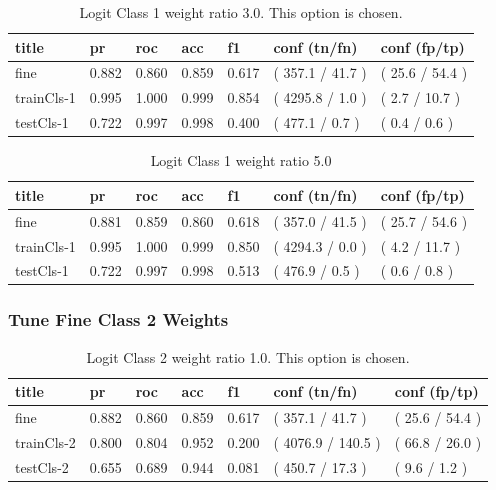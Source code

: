 \documentclass[ms]{nuthesis}
\begin{document}
\FloatBarrier
\begin{table}[H]
\centering
\caption{Logit Class 1 weight ratio 3.0. This option is chosen.}
\label{tab:LogRegCls1-Wt3}
\begin{tabular}{|l||l||l||l||l||l||l|}\toprule
title & pr & roc & acc & f1 & conf (tn/fn) & conf (fp/tp) \\ \midrule
fine & 0.882 & 0.860 & 0.859 & 0.617 & ( 357.1 / 41.7 ) & ( 25.6 / 54.4 ) \\
trainCls-1 & 0.995 & 1.000 & 0.999 & 0.854 & ( 4295.8 / 1.0 ) & ( 2.7 / 10.7 ) \\
testCls-1 & 0.722 & 0.997 & 0.998 & 0.400 & ( 477.1 / 0.7 ) & ( 0.4 / 0.6 ) \\ \bottomrule
\end{tabular}
\end{table}
\FloatBarrier

\FloatBarrier
\begin{table}[H]
\centering
\caption{Logit Class 1 weight ratio 5.0}
\label{tab:LogRegCls1-Wt5}
\begin{tabular}{|l||l||l||l||l||l||l|}\toprule
title & pr & roc & acc & f1 & conf (tn/fn) & conf (fp/tp) \\ \midrule
fine & 0.881 & 0.859 & 0.860 & 0.618 & ( 357.0 / 41.5 ) & ( 25.7 / 54.6 ) \\
trainCls-1 & 0.995 & 1.000 & 0.999 & 0.850 & ( 4294.3 / 0.0 ) & ( 4.2 / 11.7 ) \\
testCls-1 & 0.722 & 0.997 & 0.998 & 0.513 & ( 476.9 / 0.5 ) & ( 0.6 / 0.8 ) \\ \bottomrule
\end{tabular}
\end{table}
\FloatBarrier


\subsubsection{Tune Fine Class 2 Weights}
\FloatBarrier
\begin{table}[H]
\centering
\caption{Logit Class 2 weight ratio 1.0. This option is chosen.}
\label{tab:LogRegCls2-Wt1}
\begin{tabular}{|l||l||l||l||l||l||l|}\toprule
title & pr & roc & acc & f1 & conf (tn/fn) & conf (fp/tp) \\ \midrule
fine & 0.882 & 0.860 & 0.859 & 0.617 & ( 357.1 / 41.7 ) & ( 25.6 / 54.4 ) \\
trainCls-2 & 0.800 & 0.804 & 0.952 & 0.200 & ( 4076.9 / 140.5 ) & ( 66.8 / 26.0 ) \\
testCls-2 & 0.655 & 0.689 & 0.944 & 0.081 & ( 450.7 / 17.3 ) & ( 9.6 / 1.2 ) \\ \bottomrule
\end{tabular}
\end{table}
\FloatBarrier
\end{document}
